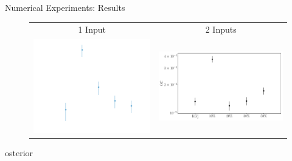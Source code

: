 \documentclass{beamer}
\begin{document}
\begin{frame}{Numerical Experiments: Results}
\begin{figure}[H]
	\centering
	\begin{tabular}{cc}
		1 Input  &2 Inputs\\
		\includegraphics[width=5.2cm]{comparisons_1D.pdf} &
		\includegraphics[width=5.5cm]{comparisons_2D.pdf}\\
		
	\end{tabular}
\end{figure}

\end{frame}osterior 
\end{document}
